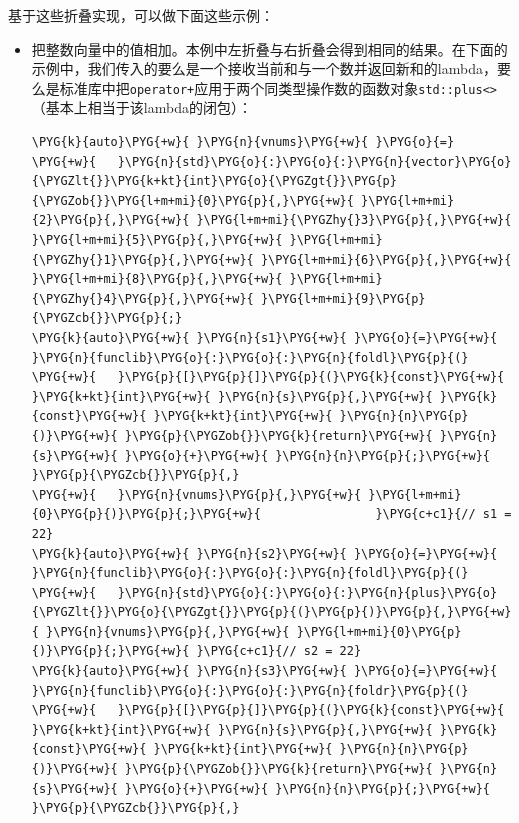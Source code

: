 
基于这些折叠实现，可以做下面这些示例：



\begin{itemize}
\item 把整数向量中的值相加。本例中左折叠与右折叠会得到相同的结果。在下面的示例中，我们传入的要么是一个接收当前和与一个数并返回新和的lambda，要么是标准库中把\texttt{operator+}应用于两个同类型操作数的函数对象\texttt{std::\allowbreak{}plus<>}（基本上相当于该lambda的闭包）：



\begin{codeblockbg}
\begin{Verbatim}[commandchars=\\\{\},breaklines=true,breakanywhere=true,fontsize=\codefont,xleftmargin=17bp]
\PYG{k}{auto}\PYG{+w}{ }\PYG{n}{vnums}\PYG{+w}{ }\PYG{o}{=}
\PYG{+w}{   }\PYG{n}{std}\PYG{o}{:}\PYG{o}{:}\PYG{n}{vector}\PYG{o}{\PYGZlt{}}\PYG{k+kt}{int}\PYG{o}{\PYGZgt{}}\PYG{p}{\PYGZob{}}\PYG{l+m+mi}{0}\PYG{p}{,}\PYG{+w}{ }\PYG{l+m+mi}{2}\PYG{p}{,}\PYG{+w}{ }\PYG{l+m+mi}{\PYGZhy{}3}\PYG{p}{,}\PYG{+w}{ }\PYG{l+m+mi}{5}\PYG{p}{,}\PYG{+w}{ }\PYG{l+m+mi}{\PYGZhy{}1}\PYG{p}{,}\PYG{+w}{ }\PYG{l+m+mi}{6}\PYG{p}{,}\PYG{+w}{ }\PYG{l+m+mi}{8}\PYG{p}{,}\PYG{+w}{ }\PYG{l+m+mi}{\PYGZhy{}4}\PYG{p}{,}\PYG{+w}{ }\PYG{l+m+mi}{9}\PYG{p}{\PYGZcb{}}\PYG{p}{;}
\PYG{k}{auto}\PYG{+w}{ }\PYG{n}{s1}\PYG{+w}{ }\PYG{o}{=}\PYG{+w}{ }\PYG{n}{funclib}\PYG{o}{:}\PYG{o}{:}\PYG{n}{foldl}\PYG{p}{(}
\PYG{+w}{   }\PYG{p}{[}\PYG{p}{]}\PYG{p}{(}\PYG{k}{const}\PYG{+w}{ }\PYG{k+kt}{int}\PYG{+w}{ }\PYG{n}{s}\PYG{p}{,}\PYG{+w}{ }\PYG{k}{const}\PYG{+w}{ }\PYG{k+kt}{int}\PYG{+w}{ }\PYG{n}{n}\PYG{p}{)}\PYG{+w}{ }\PYG{p}{\PYGZob{}}\PYG{k}{return}\PYG{+w}{ }\PYG{n}{s}\PYG{+w}{ }\PYG{o}{+}\PYG{+w}{ }\PYG{n}{n}\PYG{p}{;}\PYG{+w}{ }\PYG{p}{\PYGZcb{}}\PYG{p}{,}
\PYG{+w}{   }\PYG{n}{vnums}\PYG{p}{,}\PYG{+w}{ }\PYG{l+m+mi}{0}\PYG{p}{)}\PYG{p}{;}\PYG{+w}{                }\PYG{c+c1}{// s1 = 22}
\PYG{k}{auto}\PYG{+w}{ }\PYG{n}{s2}\PYG{+w}{ }\PYG{o}{=}\PYG{+w}{ }\PYG{n}{funclib}\PYG{o}{:}\PYG{o}{:}\PYG{n}{foldl}\PYG{p}{(}
\PYG{+w}{   }\PYG{n}{std}\PYG{o}{:}\PYG{o}{:}\PYG{n}{plus}\PYG{o}{\PYGZlt{}}\PYG{o}{\PYGZgt{}}\PYG{p}{(}\PYG{p}{)}\PYG{p}{,}\PYG{+w}{ }\PYG{n}{vnums}\PYG{p}{,}\PYG{+w}{ }\PYG{l+m+mi}{0}\PYG{p}{)}\PYG{p}{;}\PYG{+w}{ }\PYG{c+c1}{// s2 = 22}
\PYG{k}{auto}\PYG{+w}{ }\PYG{n}{s3}\PYG{+w}{ }\PYG{o}{=}\PYG{+w}{ }\PYG{n}{funclib}\PYG{o}{:}\PYG{o}{:}\PYG{n}{foldr}\PYG{p}{(}
\PYG{+w}{   }\PYG{p}{[}\PYG{p}{]}\PYG{p}{(}\PYG{k}{const}\PYG{+w}{ }\PYG{k+kt}{int}\PYG{+w}{ }\PYG{n}{s}\PYG{p}{,}\PYG{+w}{ }\PYG{k}{const}\PYG{+w}{ }\PYG{k+kt}{int}\PYG{+w}{ }\PYG{n}{n}\PYG{p}{)}\PYG{+w}{ }\PYG{p}{\PYGZob{}}\PYG{k}{return}\PYG{+w}{ }\PYG{n}{s}\PYG{+w}{ }\PYG{o}{+}\PYG{+w}{ }\PYG{n}{n}\PYG{p}{;}\PYG{+w}{ }\PYG{p}{\PYGZcb{}}\PYG{p}{,}

\end{Verbatim}
\end{codeblockbg}
\end{itemize}
